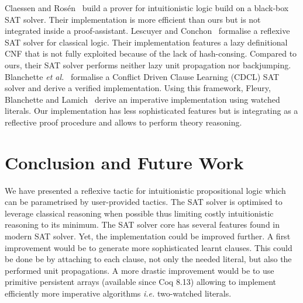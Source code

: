 \documentclass[a4paper,UKenglish,cleveref, autoref, thm-restate]{lipics-v2019}
\begin{document}
Claessen and Ros{\'{e}}n~\cite{ClaessenR15} build a prover for
intuitionistic logic build on a black-box SAT solver. Their
implementation is more efficient than ours but is not integrated
inside a proof-assistant. 
% 
Lescuyer and
Conchon~\cite{lescuyer08tphol,LescuyerC09} formalise a reflexive SAT
solver for classical logic. Their implementation features a lazy
definitional CNF that is not fully exploited because of the lack of
hash-consing. Compared to ours, their SAT solver performs neither lazy
unit propagation nor backjumping.
%
Blanchette \emph{et al.}~\cite{BlanchetteFLW18} formalise a Conflict
Driven Clause Learning (CDCL) SAT solver and derive a verified
implementation. Using this framework, Fleury, Blanchette and
Lamich~\cite{FleuryBL18} derive an imperative implementation using
watched literals. Our implementation has less sophisticated features
but is integrating as a reflective proof procedure and allows to
perform theory reasoning.



\section{Conclusion and Future Work}
\label{sec:conclusion}

We have presented  a reflexive tactic for intuitionistic
propositional logic which can be parametrised by user-provided tactics.
%
The SAT solver is optimised to leverage classical reasoning when
possible thus limiting costly intuitionistic reasoning to its minimum.
%
The SAT solver
core has several features found in modern SAT solver. Yet, the
implementation could be improved further. A first improvement would be
to generate more sophisticated learnt clauses. This could be done be
by attaching to each clause, not only the needed literal, but also the
performed unit propagations. A more drastic improvement would be to use
primitive persistent arrays (available since Coq 8.13) allowing to
implement efficiently more imperative algorithms \emph{i.e.}
two-watched literals.





\end{document}
